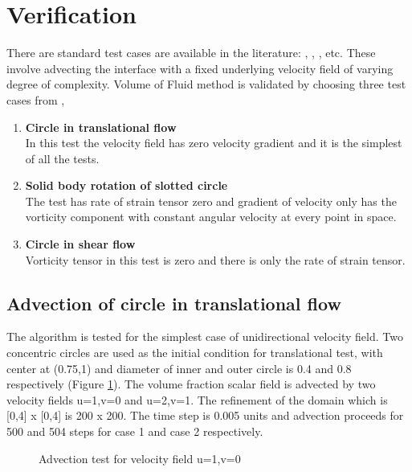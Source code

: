 \section{Verification}
There are standard test cases are available in the literature: \cite{Zalesak1979}, \cite{Puckett1997}, \cite{Anton2001}, \cite{Gerlach2006} etc.
These involve advecting the interface with a fixed underlying velocity field of varying degree of complexity.
Volume of Fluid method is validated by choosing three test cases from \cite{Rudman1997}, 

\begin{enumerate}
 \item \textbf{Circle in translational flow} \\
 In this test the velocity field has zero velocity gradient and it is the simplest of all the tests.
 \item \textbf{Solid body rotation of slotted circle} \\
 The test has rate of strain tensor zero and gradient of velocity only has the vorticity component with constant angular velocity at every point in space.
 \item \textbf{Circle in shear flow} \\
Vorticity tensor in this test is zero and there is only the rate of strain tensor.
\end{enumerate}

\subsection{Advection of circle in translational flow}
The algorithm is tested for the simplest case of unidirectional velocity field. Two concentric circles are used as the initial 
condition for translational test, with center at (0.75,1) and diameter of inner and outer circle is 0.4 and 0.8 respectively (Figure \ref{Fig:translational_test}).
The volume fraction scalar field is advected by two velocity fields u=1,v=0 and u=2,v=1. The refinement of the domain which is [0,4] x [0,4] is 200 x 200. The time
step is 0.005 units and advection proceeds for 500 and 504 steps for case 1 and case 2 respectively.

\begin{figure}%
 \centering
 \caption{Advection test for velocity field u=1,v=0}
 \label{Fig:translational_test}
\end{figure}

